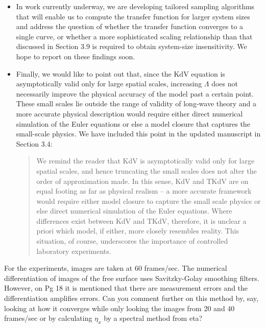 \documentclass[11pt]{article}
\newcommand{\comment}[1]{{\color{blue} #1}}
\begin{document}
\begin{itemize}
\item In  work currently underway, we are developing tailored sampling algorithms that will enable us to compute the transfer function for larger system sizes and address the question of whether the transfer function converges to a single curve, or whether a more sophisticated scaling relationship than that discussed in Section 3.9 is required to obtain system-size insensitivity. We hope to report on these findings soon.

\item Finally, we would like to point out that, since the KdV equation is asymptotically valid only for large spatial scales, increasing $\Lambda$ does not necessarily improve the physical accuracy of the model past a certain point. These small scales lie outside the range of validity of long-wave theory and a more accurate physical description would require either direct numerical simulation of the Euler equations or else a model closure that captures the small-scale physics. We have included this point in the updated manuscript in Section 3.4:
\begin{quotation}
We remind the reader that KdV is asymptotically valid only for large spatial scales, and hence truncating the small scales does not alter the order of approximation made. In this sense, KdV and TKdV are on equal footing as far as physical realism – a more accurate framework would require either model closure to capture the small scale physics or else direct numerical simulation of the Euler equations. Where differences exist between KdV and TKdV, therefore, it is unclear a priori which model, if either, more closely resembles reality. This situation, of course, underscores the importance of controlled laboratory experiments.
\end{quotation}
\end{itemize}

\noindent
\comment{For the experiments, images are taken at 60 frames/sec. The numerical differentiation of images of the free surface uses Savitzky-Golay smoothing filters. However, on Pg 18 it is mentioned that there are measurement errors and the differentiation amplifies errors. Can you comment further on this method by, say, looking at how it converges while only looking the images from 20 and 40 frames/sec or by calculating $\eta_x$ by a spectral method from eta? }
\end{document}
